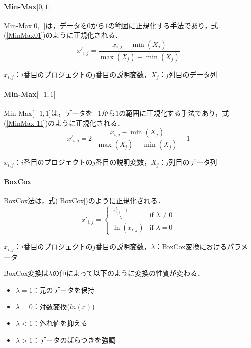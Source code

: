 \paragraph{Min-Max$\lbrack0, 1\rbrack$ \quad \\}
Min-Max$\lbrack0, 1\rbrack$\cite{Huang2017}は，データを$0$から$1$の範囲に正規化する手法であり，式(\ref{MinMax01})のように正規化される．
\begin{equation}
  \label{MinMax01}
  x'_{i,j} = \frac{x_{i,j} - \min(X_j)}{\max(X_j) - \min(X_j)}
\end{equation}
\begin{center}
  $x_{i,j}$：$i$番目のプロジェクトの$j$番目の説明変数，$X_j$：$j$列目のデータ列
\end{center}

\paragraph{Min-Max$\lbrack-1, 1\rbrack$ \quad \\}
Min-Max$\lbrack-1, 1\rbrack$\cite{Huang2017}は，データを$-1$から$1$の範囲に正規化する手法であり，式(\ref{MinMax-11})のように正規化される．
\begin{equation}
  \label{MinMax-11}
  x'_{i,j} = 2 \cdot \frac{x_{i,j} - \min(X_j)}{\max(X_j) - \min(X_j)} - 1
\end{equation}
\begin{center}
  $x_{i,j}$：$i$番目のプロジェクトの$j$番目の説明変数，$X_j$：$j$列目のデータ列
\end{center}

\paragraph{BoxCox \quad \\}
BoxCox法は，式(\ref{BoxCox})のように正規化される．
\begin{equation}
  \label{BoxCox}
  x'_{i,j} = 
    \begin{cases} 
    \frac{x_{i,j}^\lambda - 1}{\lambda} & \text{if } \lambda \neq 0 \\
    \ln(x_{i,j}) & \text{if } \lambda = 0
    \end{cases}
\end{equation}
\begin{center}
  $x_{i,j}$：$i$番目のプロジェクトの$j$番目の説明変数，$\lambda$：BoxCox変換におけるパラメータ
\end{center}
BoxCox変換は$\lambda$の値によって以下のように変換の性質が変わる．
\begin{itemize}
  \item $\lambda=1$：元のデータを保持
  \item $\lambda=0$：対数変換($ln(x)$)
  \item $\lambda<1$：外れ値を抑える
  \item $\lambda>1$：データのばらつきを強調
\end{itemize}

